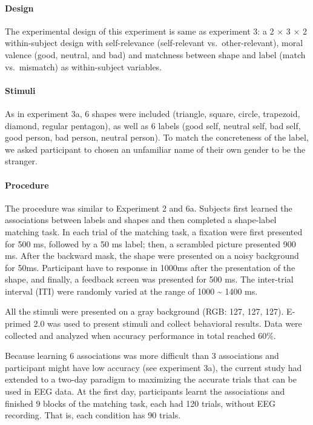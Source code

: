 \documentclass[
  english,
  man]{apa6}
\let\oldparagraph\paragraph
\renewcommand{\paragraph}[1]{\oldparagraph{#1}\mbox{}}
\begin{document}
\hypertarget{design-2}{%
\paragraph{Design}\label{design-2}}

The experimental design of this experiment is same as experiment 3: a 2 × 3 × 2 within-subject design with self-relevance (self-relevant vs.~other-relevant), moral valence (good, neutral, and bad) and matchness between shape and label (match vs.~mismatch) as within-subject variables.

\hypertarget{stimuli-3}{%
\paragraph{Stimuli}\label{stimuli-3}}

As in experiment 3a, 6 shapes were included (triangle, square, circle, trapezoid, diamond, regular pentagon), as well as 6 labels (good self, neutral self, bad self, good person, bad person, neutral person). To match the concreteness of the label, we asked participant to chosen an unfamiliar name of their own gender to be the stranger.

\hypertarget{procedure-7}{%
\paragraph{Procedure}\label{procedure-7}}

The procedure was similar to Experiment 2 and 6a. Subjects first learned the associations between labels and shapes and then completed a shape-label matching task. In each trial of the matching task, a fixation were first presented for 500 ms, followed by a 50 ms label; then, a scrambled picture presented 900 ms. After the backward mask, the shape were presented on a noisy background for 50ms. Participant have to response in 1000ms after the presentation of the shape, and finally, a feedback screen was presented for 500 ms. The inter-trial interval (ITI) were randomly varied at the range of 1000 \textasciitilde{} 1400 ms.

All the stimuli were presented on a gray background (RGB: 127, 127, 127). E-primed 2.0 was used to present stimuli and collect behavioral results. Data were collected and analyzed when accuracy performance in total reached 60\%.

Because learning 6 associations was more difficult than 3 associations and participant might have low accuracy (see experiment 3a), the current study had extended to a two-day paradigm to maximizing the accurate trials that can be used in EEG data. At the first day, participants learnt the associations and finished 9 blocks of the matching task, each had 120 trials, without EEG recording. That is, each condition has 90 trials.
\end{document}
